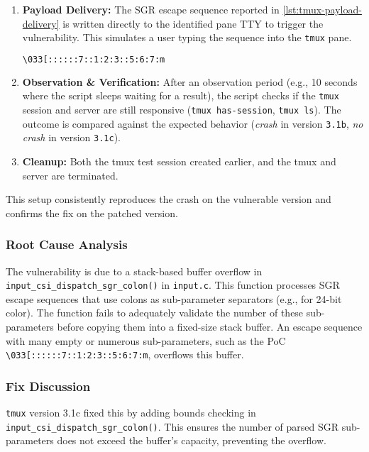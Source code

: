 \begin{enumerate}
	\item \textbf{Payload Delivery:} The SGR escape sequence reported in \autoref{lst:tmux-payload-delivery} is written directly to the identified pane TTY to trigger the vulnerability. This simulates a user typing the sequence into the \texttt{tmux} pane.

	      \begin{lstlisting}[language=bash, caption=Payload delivery to the tmux pane, label=lst:tmux-payload-delivery]
\033[::::::7::1:2:3::5:6:7:m
\end{lstlisting}

	\item \textbf{Observation \& Verification:} After an observation period (e.g., 10 seconds where the script sleeps waiting for a result), the script checks if the \texttt{tmux} session and server are still responsive (\texttt{tmux has-session}, \texttt{tmux ls}). The outcome is compared against the expected behavior (\emph{crash} in version \texttt{3.1b}, \emph{no crash} in version \texttt{3.1c}).

	\item \textbf{Cleanup:} Both the tmux test session created earlier, and the tmux and server are terminated.
\end{enumerate}

This setup consistently reproduces the crash on the vulnerable version and confirms the fix on the patched version.

\subsubsection{Root Cause Analysis}

The vulnerability is due to a stack-based buffer overflow in \texttt{input\_csi\_dispatch\_sgr\_colon()} in \texttt{input.c}. This function processes SGR escape sequences that use colons as sub-parameter separators (e.g., for 24-bit color). The function fails to adequately validate the number of these sub-parameters before copying them into a fixed-size stack buffer. An escape sequence with many empty or numerous sub-parameters, such as the PoC \texttt{\textbackslash{}033[::::::7::1:2:3::5:6:7:m}, overflows this buffer.

\subsubsection{Fix Discussion}

\texttt{tmux} version 3.1c fixed this by adding bounds checking in \texttt{input\_csi\_dispatch\_sgr\_colon()}. This ensures the number of parsed SGR sub-parameters does not exceed the buffer's capacity, preventing the overflow.

